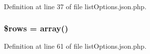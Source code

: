 \-Definition at line 37 of file list\-Options.\-json.\-php.

\hypertarget{list_options_8json_8php_ace2ec39e7df3899fa8df9640ec274b03}{
\subsubsection[{\$rows}]{\setlength{\rightskip}{0pt plus 5cm}\$rows = array()}}\label{list_options_8json_8php_ace2ec39e7df3899fa8df9640ec274b03}


\-Definition at line 61 of file list\-Options.\-json.\-php.

